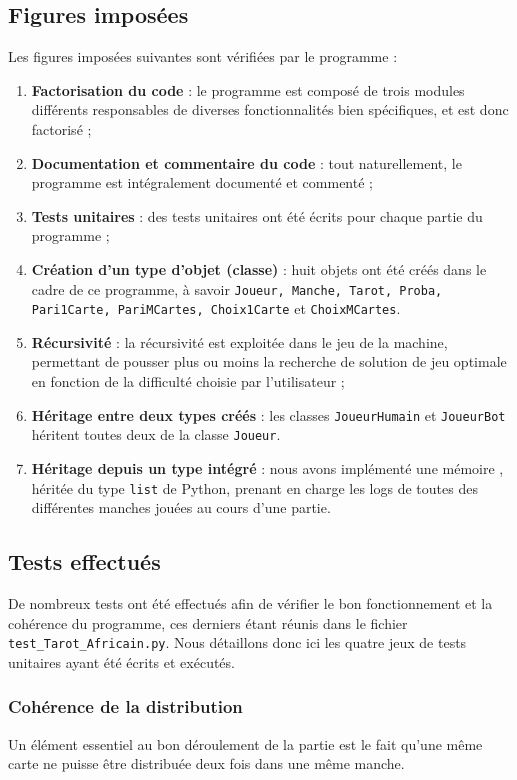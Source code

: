    \subsection{Figures imposées}\label{subsec:figures-imposées}
      Les figures imposées suivantes sont vérifiées par le programme :
      \begin{enumerate}
         \item \textbf{Factorisation du code} : le programme est composé de trois modules différents responsables de diverses fonctionnalités bien spécifiques, et est donc factorisé ;
         \item \textbf{Documentation et commentaire du code} : tout naturellement, le programme est intégralement documenté et commenté ;
         \item \textbf{Tests unitaires} : des tests unitaires ont été écrits pour chaque partie du programme ;
         \item \textbf{Création d'un type d'objet (classe)} : huit objets ont été créés dans le cadre de ce programme, à savoir \texttt{Joueur, Manche, Tarot, Proba, Pari1Carte, PariMCartes, Choix1Carte} et \texttt{ChoixMCartes}.
         \item \textbf{Récursivité} : la récursivité est exploitée dans le jeu de la machine, permettant de pousser plus ou moins la recherche de solution de jeu optimale en fonction de la difficulté choisie par l'utilisateur ;
         \item \textbf{Héritage entre deux types créés} : les classes \texttt{JoueurHumain} et \texttt{JoueurBot} héritent toutes deux de la classe \texttt{Joueur}.
         \item \textbf{Héritage depuis un type intégré} : nous avons implémenté une \og mémoire \fg{}, héritée du type \texttt{list} de Python, prenant en charge les logs de toutes des différentes manches jouées au cours d'une partie.
      \end{enumerate}

   \subsection{Tests effectués}\label{subsec:tests-effectués}
      De nombreux tests ont été effectués afin de vérifier le bon fonctionnement et la cohérence du programme, ces derniers étant réunis dans le fichier \texttt{test\_Tarot\_Africain.py}.
      Nous détaillons donc ici les quatre jeux de tests unitaires ayant été écrits et exécutés.

      \subsubsection{Cohérence de la distribution}
         Un élément essentiel au bon déroulement de la partie est le fait qu'une même carte ne puisse être distribuée deux fois dans une même manche.

